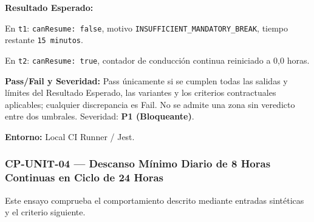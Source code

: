 \par\noindent\textbf{Resultado Esperado:} \par
   En \texttt{t\allowbreak{}1\allowbreak{}}: \texttt{c\allowbreak{}a\allowbreak{}n\allowbreak{}R\allowbreak{}e\allowbreak{}s\allowbreak{}u\allowbreak{}m\allowbreak{}e\allowbreak{}:\allowbreak{} f\allowbreak{}a\allowbreak{}l\allowbreak{}s\allowbreak{}e\allowbreak{}}, motivo \texttt{I\allowbreak{}N\allowbreak{}S\allowbreak{}U\allowbreak{}F\allowbreak{}F\allowbreak{}I\allowbreak{}C\allowbreak{}I\allowbreak{}E\allowbreak{}N\allowbreak{}T\allowbreak{}\_\allowbreak{}M\allowbreak{}A\allowbreak{}N\allowbreak{}D\allowbreak{}A\allowbreak{}T\allowbreak{}O\allowbreak{}R\allowbreak{}Y\allowbreak{}\_\allowbreak{}B\allowbreak{}R\allowbreak{}E\allowbreak{}A\allowbreak{}K\allowbreak{}}, tiempo restante \texttt{1\allowbreak{}5\allowbreak{} m\allowbreak{}i\allowbreak{}n\allowbreak{}u\allowbreak{}t\allowbreak{}o\allowbreak{}s\allowbreak{}}.\par
   En \texttt{t\allowbreak{}2\allowbreak{}}: \texttt{c\allowbreak{}a\allowbreak{}n\allowbreak{}R\allowbreak{}e\allowbreak{}s\allowbreak{}u\allowbreak{}m\allowbreak{}e\allowbreak{}:\allowbreak{} t\allowbreak{}r\allowbreak{}u\allowbreak{}e\allowbreak{}}, contador de conducción continua reiniciado a 0,0 horas.\par
\par\noindent\textbf{Pass/Fail y Severidad:} Pass únicamente si se cumplen todas las salidas y límites del Resultado Esperado, las variantes y los criterios contractuales aplicables; cualquier discrepancia es Fail. No se admite una zona sin veredicto entre dos umbrales. Severidad: \textbf{P1 (Bloqueante)}.\par
\par\noindent\textbf{Entorno:} Local CI Runner / Jest.\par






\subsubsection*{CP-UNIT-04 — Descanso Mínimo Diario de 8 Horas Continuas en Ciclo de 24 Horas}\label{sec:9-cp-unit-04}
Este ensayo comprueba el comportamiento descrito mediante entradas sintéticas y el criterio siguiente.

